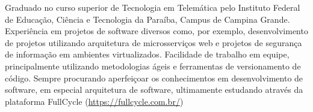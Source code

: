 \begin{cvletter}
  Graduado no curso superior de Tecnologia em Telemática pelo Instituto Federal de Educação, Ciência e Tecnologia da Paraíba, Campus de Campina Grande.
  Experiência em projetos de software diversos como, por exemplo, desenvolvimento de projetos utilizando arquitetura de microsserviços web e projetos de segurança de informação em ambientes virtualizados.
  Facilidade de trabalho em equipe, principalmente utilizando metodologias ágeis e ferramentas de versionamento de código.
  Sempre procurando aperfeiçoar os conhecimentos em desenvolvimento de software, em especial arquitetura de software, ultimamente estudando através da plataforma FullCycle (\url{https://fullcycle.com.br/})

\end{cvletter}
